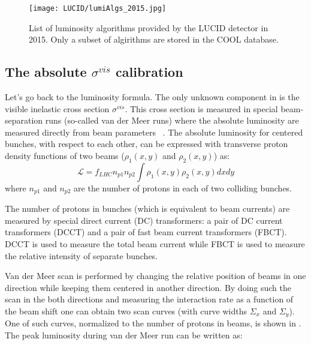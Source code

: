 \begin{figure}
\centering
\texttt{[image: LUCID/lumiAlgs\_2015.jpg]}
\caption{List of luminosity algorithms provided by the LUCID detector in 2015. Only a subset of algirithms are stored in the COOL database.}
\label{fig:InternalConsistency}
\end{figure}

\subsection{The absolute $\sigma^{vis}$ calibration}
\label{subsec:alfa_run}
Let's go back to the luminosity formula. The only unknown component in  is the visible inelastic cross section $\sigma^{vis}$.
This cross section is measured in special beam-separation runs (so-called van der Meer runs) where the absolute luminosity are measured directly from beam parameters ~\cite{vanderMeer:296752,Rubbia:1025746}.
The absolute luminosity for centered bunches, with respect to each other, can be expressed with transverse proton density functions of two beams ($\rho_{1}(x,y)$ and $\rho_{2}(x,y)$) as:
\begin{equation}
\mathscr{L} = f_{LHC} n_{p1} n_{p2} \int \rho_{1}(x,y) \rho_{2}(x,y) dx dy
\label{eq:lumi_vs_intensity}
\end{equation}
where $n_{p1}$ and $n_{p2}$ are the number of protons in each of two colliding bunches.

The number of protons in bunches (which is equivalent to beam currents) are measured by special direct current (DC) transformers: 
a pair of DC current transformers (DCCT) and a pair of fast beam current transformers (FBCT). 
DCCT is used to measure the total beam current while FBCT is used to measure the relative intensity of separate bunches.

Van der Meer scan is performed by changing the relative position of beams in one direction while keeping them centered in another direction.
By doing such the scan in the both directions and measuring the interaction rate as a function of the beam shift one can obtain two scan curves (with curve widths $\Sigma_{x}$ and $\Sigma_{y}$). One of such curves, normalized to the number of protons in beams, 
is shown in .
The peak luminosity during van der Meer run can be written as:

